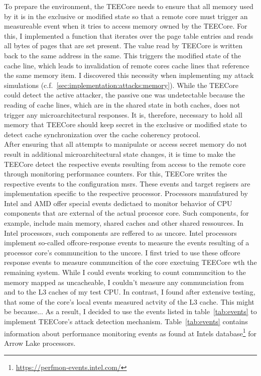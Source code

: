 To prepare the environment, the TEECore needs to ensure that all memory used by
it is in the exclusive or modified state so that a remote core must trigger an
measureable event when it tries to access memory owned by the TEECore. For this,
I implemented a function that iterates over the page table entries and reads all
bytes of pages that are set present. The value read by TEECore is written back
to the same address in the same. This triggers the modified state of the cache
line, which leads to invalidation of remote cores cache lines that reference the
same memory item. I discovered this necessity when implementing my attack
simulations (c.f.~\ref{sec:implementation:attacks:memory}). While the TEECore could detect the active attacker, the passive one
was undetectable because the reading of cache lines, which are in the shared
state in both caches, does not trigger any microarchitectural responses. It is,
therefore, necessary to hold all memory that TEECore should keep secret in
the exclusive or modified state to detect cache synchronization over the cache
coherency protocol.\\

After ensuring that all attempts to manipulate or access secret memory do not
result in additional microarchitectural state changes, it is time to make the
TEECore detect the respective events resulting from access to the remote core
through monitoring performance counters. For this, TEECore writes the respective
events to the configuration \glspl{msr}. These events and target regisers are
implementation specific to the respective processor. Processors manufatured by
Intel and AMD offer special events dedictaed to monitor behavior of CPU
components that are external of the actual procesor core. Such components, for
example, include main memory, shared caches and other shared ressources. In
Intel processors, such components are reffered to as uncore. Intel processors
implement so-called offcore-response events to measure the events resulting of a
processor core's communcition to the uncore. I first tried to use these offcore
response events to measure communcition of the core exectuing TEECore wth the
remaining system. While I could events working to count communcition to the
memory mapped as uncacheable, I couldn't measure any communciation from and to
the L3 caches of my test CPU. In contrast, I found after extensive testing, that
some of the core's local events measured actvity of the L3 cache. This might be
because...  As a result, I decided to use the events
listed in table~\ref{tab:events} to implement TEECore's attack detection
mechanism. Table~\ref{tab:events} contains information about performance
monitoring events as found at Intels
database\footnote{\url{https://perfmon-events.intel.com/}} for Arrow Lake
processors.

